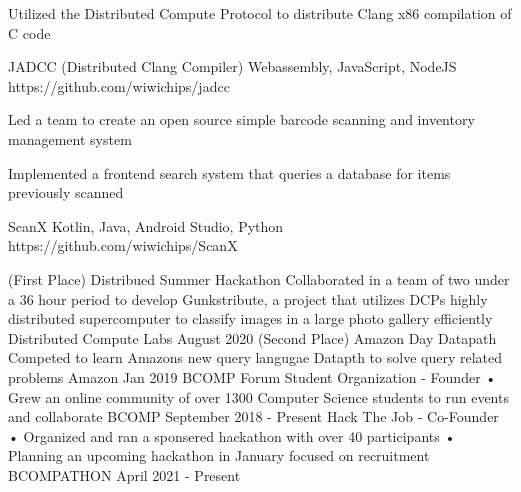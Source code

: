 \documentclass[]{awesome-cv}
\begin{document}
\vspace{-7mm}
\begin{cventries}
	\cventry
  {\begin{cvitems}
  	\item{Utilized the Distributed Compute Protocol to distribute Clang x86 compilation of C code}
  \end{cvitems}}
	{JADCC (Distributed Clang Compiler)}
	{Webassembly, JavaScript, NodeJS}
	{https://github.com/wiwichips/jadcc}
	{}
	
	\vspace{-5mm}
	\cventry
  {\begin{cvitems}
    \item{Led a team to create an open source simple barcode scanning and inventory management system}
    \item{Implemented a frontend search system that queries a database for items previously scanned}
  \end{cvitems}}
	{ScanX}
	{Kotlin, Java, Android Studio, Python}
	{https://github.com/wiwichips/ScanX}
	{}

	\vspace{-5mm}
\end{cventries}
\begin{cvhonors}
	\cvhonor
	{(First Place) Distribued Summer Hackathon}
	{Collaborated in a team of two under a 36 hour period to develop Gunkstribute, a project that utilizes DCP\textquotesingle{}s highly distributed supercomputer to classify images in a large photo gallery efficiently}
	{Distributed Compute Labs}
	{August 2020}
	\cvhonor
	{(Second Place) Amazon Day Datapath}
	{Competed to learn Amazon\textquotesingle{}s new query langugae Datapth to solve query related problems}
	{Amazon}
	{Jan 2019}
	\cvhonor
	{BCOMP Forum Student Organization - Founder}
	{• Grew an online community of over 1300 Computer Science students to run events and collaborate}
	{BCOMP}
	{September 2018 - Present}
  \cvhonor
  {Hack The Job - Co-Founder}
  {• Organized and ran a sponsered hackathon with over 40 participants • Planning an upcoming hackathon in January focused on recruitment}
  {BCOMPATHON}
  {April 2021 - Present}
\end{cvhonors}
\ 
\end{document}
